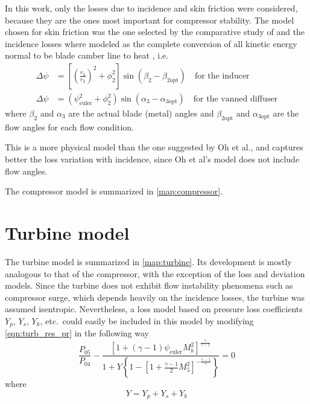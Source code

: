 In this work, only the losses due to incidence and skin friction were considered, because they are the ones most important for compressor stability. The model chosen for skin friction was the one selected by the comparative study of \textcite{Oh1997} and the incidence losses where modeled as the complete conversion of all kinetic energy normal to be blade camber line to heat \cite{Galvas1973}, i.e.\
\begin{align}
    \Delta \psi &= \left[\left(\frac{r_3}{r_2}\right)^2 + \phi_2^2\right]
    \sin(\beta_2 - \beta_{2\text{opt}}) \quad\text{for the inducer} \\
    \Delta \psi &= (\psi_{\text{euler}}^2 + \phi_2^2) \sin(\alpha_3-\alpha_{3\text{opt}}) \quad\text{for the vanned diffuser}
\end{align}
where $\beta_2$ and $\alpha_3$ are the actual blade (metal) angles and $\beta_{2\text{opt}}$ and $\alpha_{3\text{opt}}$ are the flow angles for each flow condition.

This is a more physical model than the one suggested by Oh et al., and captures better the loss variation with incidence, since Oh et al's model does not include flow angles. 

The compressor model is summarized in \cref{map:compressor}.

\section{Turbine model}


The turbine model is summarized in \cref{map:turbine}. 
Its development is mostly analogous to that of the compressor, with the exception of the loss and deviation models. 
Since the turbine does not exhibit flow instability phenomena such as compressor surge, 
which depends heavily on the incidence losses, 
the turbine was assumed isentropic. 
Nevertheless, a loss model based on pressure loss coefficients $Y_p$, $Y_s$, $Y_k$, etc.\ 
could easily be included in this model by modifying \cref{eqn:turb_res_pr} in the following way
\begin{equation}
    \frac{P_{05}}{P_{04}} -\frac{[1 + (\gamma-1)\psi_{\text{euler}} M_b^2]^{\frac{\gamma}{\gamma-1}}}{1+Y\left\{1-\left[1+\tfrac{\gamma-1}{2}M_5^2\right]^{-\frac{\gamma-1}{\gamma}}\right\}} = 0 
\end{equation}
where
\begin{equation}
    Y = Y_p + Y_s + Y_k
\end{equation}


